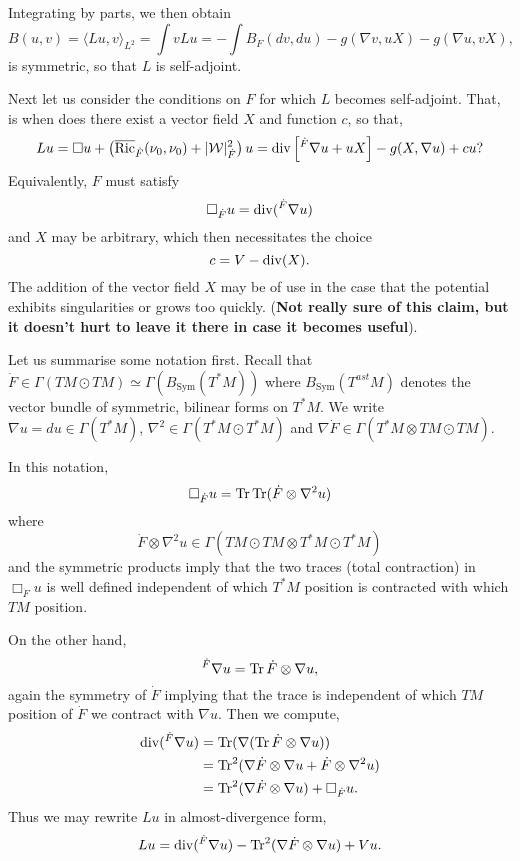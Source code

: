 \documentclass{amsart}
\begin{document}
Integrating by parts, we then obtain
\[
B(u, v) = \langle Lu, v \rangle_{L^2} = \int v L u = -\int B_{\dot{F}} (dv, du) - g(\nabla v, uX) - g(\nabla u, v X),
\]
is symmetric, so that \(L\) is self-adjoint.

Next let us consider the conditions on \(F\) for which \(L\) becomes self-adjoint. That, is when does there exist a vector field \(X\) and function \(c\), so that,
\[
L u = \Box u + \left(\overline{\operatorname{Ric}}_{\dot{F}}(\nu_0, \nu_0) + |\mathcal{W}|_{\dot{F}}^2\right) u = \operatorname{div}\left[^{\dot{F}} \nabla u + u X\right] - g(X, \nabla u) + c u?
\]
Equivalently, \(F\) must satisfy
\[
\Box_{\dot{F}} u = \operatorname{div}(^{\dot{F}} \nabla u)
\]
and \(X\) may be arbitrary, which then necessitates the choice
\[
c = V - \operatorname{div}(X).
\]
The addition of the vector field \(X\) may be of use in the case that the potential exhibits singularities or grows too quickly. (\textbf{Not really sure of this claim, but it doesn't hurt to leave it there in case it becomes useful}).

Let us summarise some notation first. Recall that \(\dot{F} \in \Gamma(TM \odot TM) \simeq \Gamma(B_{\text{Sym}}(T^{\ast}M))\) where \(B_{\text{Sym}}(T^{ast}M)\) denotes the vector bundle of symmetric, bilinear forms on \(T^{\ast}M\). We write \(\nabla u = du \in \Gamma(T^{\ast} M)\), \(\nabla^2 \in \Gamma(T^{\ast} M \odot T^{\ast} M)\) and \(\nabla \dot{F} \in \Gamma(T^{\ast} M \otimes TM \odot TM)\).

In this notation,
\[
\Box_{\dot{F}} u = \operatorname{Tr} \operatorname{Tr} (\dot{F} \otimes \nabla^2 u)
\]
where
\[
\dot{F} \otimes \nabla^2 u \in \Gamma(TM \odot TM \otimes T^{\ast} M \odot T^{\ast} M)
\]
and the symmetric products imply that the two traces (total contraction) in \(\Box_{\dot{F}} u\) is well defined independent of which \(T^{\ast} M\) position is contracted with which \(TM\) position.

On the other hand,
\[
^{\dot{F}}\nabla u = \operatorname{Tr} \dot{F} \otimes \nabla u,
\]
again the symmetry of \(\dot{F}\) implying that the trace is independent of which \(TM\) position of \(\dot{F}\) we contract with \(\nabla u\). Then we compute,
\begin{align*}
\operatorname{div} (^{\dot{F}}\nabla u) &= \operatorname{Tr} (\nabla(\operatorname{Tr} \dot{F} \otimes \nabla u)) \\
&= \operatorname{Tr}^2 (\nabla \dot{F} \otimes \nabla u + \dot{F} \otimes \nabla^2 u) \\
&= \operatorname{Tr}^2 (\nabla \dot{F} \otimes \nabla u) + \Box_{\dot{F}} u.
\end{align*}
Thus we may rewrite \(L u\) in almost-divergence form,
\[
L u = \operatorname{div} (^{\dot{F}}\nabla u) - \operatorname{Tr}^2 (\nabla \dot{F} \otimes \nabla u) + V u.
\]
\end{document}
